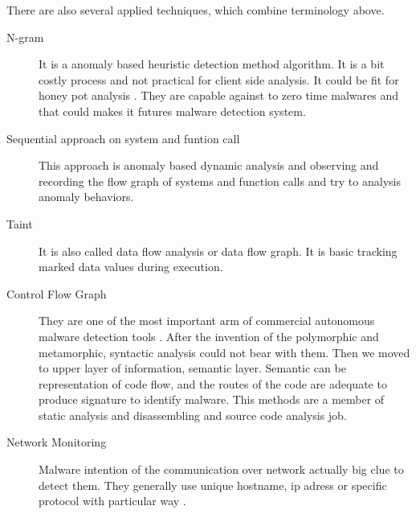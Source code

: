 There are also several applied techniques, which combine terminology above. 
\begin{description}
\item[N-gram] It is a anomaly  based heuristic detection method algorithm. It is a bit costly process and not practical for client side analysis. It could be fit for honey pot analysis \cite{reddy2006n} \cite{abou2004n} \cite{abou2004detection}. They are capable against to zero time malwares and that could makes it futures malware detection system. 
\item[Sequential approach on system and funtion call] This approach is anomaly based dynamic analysis and observing and recording the flow graph of systems and function calls and  try to analysis anomaly behaviors.\cite{kendall2007practical}
\item[Taint] It is also called data flow analysis or data flow graph. It is basic tracking marked data values during execution.\cite{saxena2008efficient}\cite{saxena2008efficient}\cite{smith2007principles}
\item[Control Flow Graph] They are one of the most important arm of commercial autonomous malware detection tools\cite{lee2010detecting} \cite{christodorescu2006static} \cite{christodorescu2005semantics}. After the invention of the polymorphic and metamorphic, syntactic analysis could not bear with them. Then we moved to upper layer of information, semantic layer. Semantic can be representation of code flow, and the routes of the code are adequate to produce signature to identify malware. This methods are a member of static analysis and disassembling and source code analysis job.
\item[Network Monitoring] Malware intention of the communication over network actually big clue to detect them. They generally use unique hostname, ip adress or specific protocol with particular way \cite{marpaung2012survey}.
\end{description}